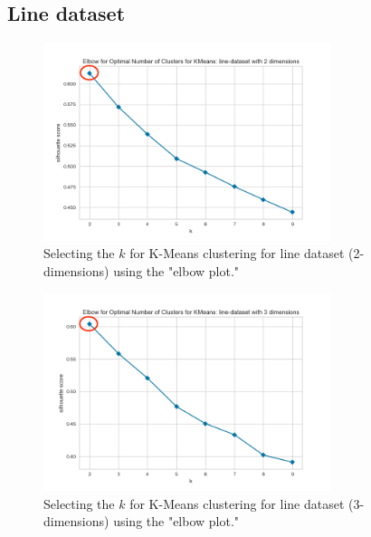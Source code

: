 \subsection{Line dataset}
\begin{figure}[H]
  \includegraphics[width=0.75\textwidth]{Method/images/k-values/line-dataset-2-kmeans.png}
  \caption{Selecting the $k$ for K-Means clustering for line dataset (2-dimensions) using the "elbow plot."}
  \label{hyperparameters:agglomerative-line-dataset-2d}
\end{figure}
\begin{figure}[H]
  \includegraphics[width=0.75\textwidth]{Method/images/k-values/line-dataset-3-kmeans.png}
  \caption{Selecting the $k$ for K-Means clustering for line dataset (3-dimensions) using the "elbow plot."}
  \label{hyperparameters:agglomerative-line-dataset-3d}
\end{figure}
\newpage
